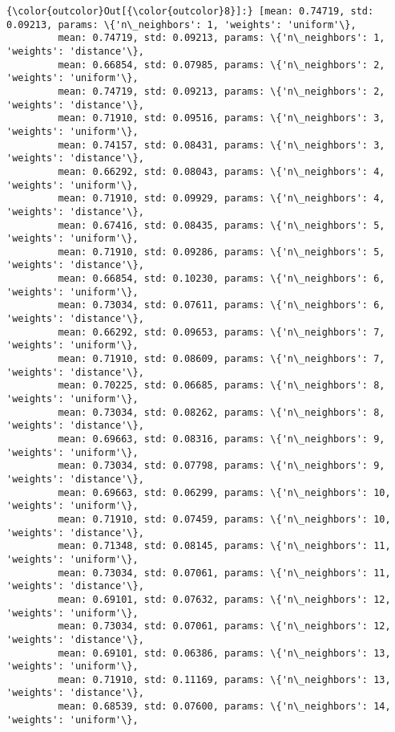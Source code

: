 \documentclass[11pt]{article}
\begin{document}
\begin{Verbatim}[commandchars=\\\{\}]
{\color{outcolor}Out[{\color{outcolor}8}]:} [mean: 0.74719, std: 0.09213, params: \{'n\_neighbors': 1, 'weights': 'uniform'\},
         mean: 0.74719, std: 0.09213, params: \{'n\_neighbors': 1, 'weights': 'distance'\},
         mean: 0.66854, std: 0.07985, params: \{'n\_neighbors': 2, 'weights': 'uniform'\},
         mean: 0.74719, std: 0.09213, params: \{'n\_neighbors': 2, 'weights': 'distance'\},
         mean: 0.71910, std: 0.09516, params: \{'n\_neighbors': 3, 'weights': 'uniform'\},
         mean: 0.74157, std: 0.08431, params: \{'n\_neighbors': 3, 'weights': 'distance'\},
         mean: 0.66292, std: 0.08043, params: \{'n\_neighbors': 4, 'weights': 'uniform'\},
         mean: 0.71910, std: 0.09929, params: \{'n\_neighbors': 4, 'weights': 'distance'\},
         mean: 0.67416, std: 0.08435, params: \{'n\_neighbors': 5, 'weights': 'uniform'\},
         mean: 0.71910, std: 0.09286, params: \{'n\_neighbors': 5, 'weights': 'distance'\},
         mean: 0.66854, std: 0.10230, params: \{'n\_neighbors': 6, 'weights': 'uniform'\},
         mean: 0.73034, std: 0.07611, params: \{'n\_neighbors': 6, 'weights': 'distance'\},
         mean: 0.66292, std: 0.09653, params: \{'n\_neighbors': 7, 'weights': 'uniform'\},
         mean: 0.71910, std: 0.08609, params: \{'n\_neighbors': 7, 'weights': 'distance'\},
         mean: 0.70225, std: 0.06685, params: \{'n\_neighbors': 8, 'weights': 'uniform'\},
         mean: 0.73034, std: 0.08262, params: \{'n\_neighbors': 8, 'weights': 'distance'\},
         mean: 0.69663, std: 0.08316, params: \{'n\_neighbors': 9, 'weights': 'uniform'\},
         mean: 0.73034, std: 0.07798, params: \{'n\_neighbors': 9, 'weights': 'distance'\},
         mean: 0.69663, std: 0.06299, params: \{'n\_neighbors': 10, 'weights': 'uniform'\},
         mean: 0.71910, std: 0.07459, params: \{'n\_neighbors': 10, 'weights': 'distance'\},
         mean: 0.71348, std: 0.08145, params: \{'n\_neighbors': 11, 'weights': 'uniform'\},
         mean: 0.73034, std: 0.07061, params: \{'n\_neighbors': 11, 'weights': 'distance'\},
         mean: 0.69101, std: 0.07632, params: \{'n\_neighbors': 12, 'weights': 'uniform'\},
         mean: 0.73034, std: 0.07061, params: \{'n\_neighbors': 12, 'weights': 'distance'\},
         mean: 0.69101, std: 0.06386, params: \{'n\_neighbors': 13, 'weights': 'uniform'\},
         mean: 0.71910, std: 0.11169, params: \{'n\_neighbors': 13, 'weights': 'distance'\},
         mean: 0.68539, std: 0.07600, params: \{'n\_neighbors': 14, 'weights': 'uniform'\},

\end{Verbatim}
\end{document}
